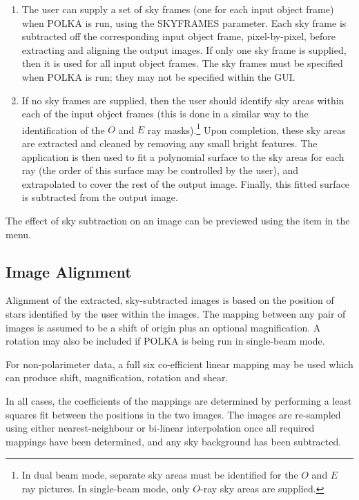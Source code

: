 \documentclass[11pt,nolof]{starlink}
\providecommand{\mylabel}[1] {\xlabel{#1}\label{#1}}
\begin{document}
\begin{enumerate}

\item The user can supply a set of sky frames (one for each input object
frame) when POLKA is run, using the SKYFRAMES parameter. Each sky
frame is subtracted off the corresponding input object frame,
pixel-by-pixel, before extracting and aligning the output images. If only
one sky frame is supplied, then it is used for all input object frames.
The sky frames must be specified when POLKA is run; they may not be
specified within the GUI.

\item If no sky frames are supplied, then the user should identify sky areas
within each of the input object frames (this is done in a similar way to
the identification of the $O$ and $E$ ray masks).\footnote{In dual beam
mode, separate sky areas must be identified for the $O$ and $E$ ray
pictures. In single-beam mode, only $O$-ray sky areas are supplied.}
Upon completion, these sky areas are extracted and cleaned by removing
any small bright features. The  application
 is then used to fit a polynomial surface
to the sky areas for each ray (the order of this surface may be controlled
by the user), and extrapolated to cover the rest of the output image.
Finally, this fitted surface is subtracted from the output image.

\end{enumerate}

The effect of sky subtraction on an image can be previewed using the
 item in the
 menu.

\subsection{\mylabel{POLKA_ALIGNMENT}Image Alignment}
Alignment of the extracted, sky-subtracted images is based on the
position of stars identified by the user within the images. The mapping
between any pair of images is assumed to be a shift of origin plus an
optional magnification. A rotation may also be included if POLKA is being
run in single-beam mode.

For non-polarimeter data, a full six co-efficient linear mapping may be
used which can produce shift, magnification, rotation and shear.

In all cases, the coefficients of the mappings are determined by
performing a least squares fit between the positions in the two images.
The images are re-sampled using either nearest-neighbour or bi-linear
interpolation once all required mappings have been determined, and any
sky background has been subtracted.
\end{document}
